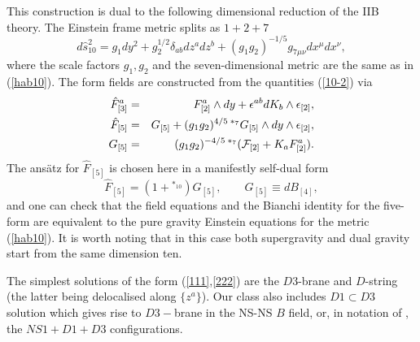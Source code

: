 \documentclass[a4paper,12pt]{article}
\begin{document}
This construction is dual to the following dimensional
reduction of the IIB theory. The Einstein frame metric splits
as $1+2+7$
\begin{equation}\label{111}
d \hat s_{10}^2 = g_1 dy^2 + g_2^{1/2} \delta_{ab} dz^a dz^b +
(g_1g_2)^{-1/5} g_{7\mu\nu} dx^\mu dx^\nu,
\end{equation}
where the scale factors $g_1,g_2$ and the seven-dimensional
metric are the same as in (\ref{hab10}). The form fields are
constructed from the quantities (\ref{10-2}) via
\begin{eqnarray}\label{222}
\hat F_{[3]}^a &=& F_{[2]}^a \wedge dy + \epsilon^{ab} d K_b
\wedge \epsilon_{[2]}, \nonumber\\
\hat F_{[5]} &=& G_{[5]} + (g_1g_2)^{4/5} \, {}^{*_7} G_{[5]}
\wedge dy \wedge \epsilon_{[2]}, \nonumber\\
G_{[5]} &=& (g_1g_2)^{-4/5} \,{}^{*_7}({\cal F}_{[2]} + K_a
F^a_{[2]}).
\end{eqnarray}
The ans\"atz for $\hat F_{[5]}$ is chosen here in a manifestly
self-dual form
\begin{equation}
\hat F_{[5]} = (1+{}^{*_{10}}) G_{[5]}, \qquad G_{[5]} \equiv
dB_{[4]},
\end{equation}
and one can check that the field equations and the Bianchi
identity for the five-form are equivalent to the pure gravity
Einstein equations for the metric (\ref{hab10}). It is worth
noting that in this case both supergravity  and dual gravity
start from the same dimension ten.

The simplest solutions of the form (\ref{111},\ref{222}) are the
$D3$-brane and $D$-string (the latter being delocalised along
$\{z^a\}$). Our class also includes $D1\subset D3$ solution which
gives rise to $D3-$brane in the NS-NS $B$ field, or, in notation
of \cite{Ts96}, the $NS1+D1+D3$ configurations.
\end{document}
